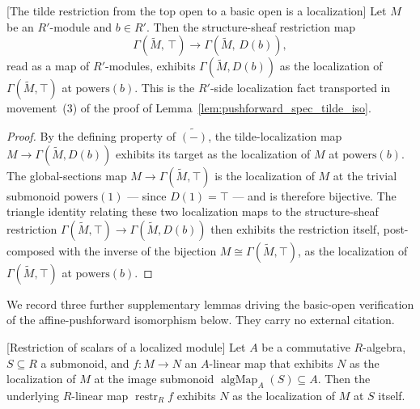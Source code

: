 \begin{lemma}


[The tilde restriction from the top open to a basic open is a localization]
  \label{lem:tildeRestriction_isLocalizedModule}
  Let \(M\) be an \(R'\)-module and \(b \in R'\). Then the structure-sheaf
  restriction map
  \[
    \Gamma(\widetilde M,\, \top) \longrightarrow \Gamma(\widetilde M,\, D(b)),
  \]
  read as a map of \(R'\)-modules, exhibits \(\Gamma(\widetilde M, D(b))\) as the
  localization of \(\Gamma(\widetilde M, \top)\) at \(\mathrm{powers}(b)\). This is
  the \(R'\)-side localization fact transported in movement~(3) of the proof of
  Lemma~\ref{lem:pushforward_spec_tilde_iso}.
\end{lemma}

\begin{proof}


  By the defining property of \(\widetilde{(-)}\), the tilde-localization map
  \(M \to \Gamma(\widetilde M, D(b))\) exhibits its target as the localization of
  \(M\) at \(\mathrm{powers}(b)\). The global-sections map
  \(M \to \Gamma(\widetilde M, \top)\) is the localization of \(M\) at the trivial
  submonoid \(\mathrm{powers}(1)\) — since \(D(1) = \top\) — and is therefore
  bijective. The triangle identity relating these two localization maps to the
  structure-sheaf restriction \(\Gamma(\widetilde M, \top) \to
  \Gamma(\widetilde M, D(b))\) then exhibits the restriction itself, post-composed
  with the inverse of the bijection \(M \cong \Gamma(\widetilde M, \top)\), as the
  localization of \(\Gamma(\widetilde M, \top)\) at \(\mathrm{powers}(b)\).
\end{proof}

We record three further supplementary lemmas driving the basic-open verification
of the affine-pushforward isomorphism below. They carry no external citation.

\begin{lemma}


[Restriction of scalars of a localized module]
  \label{lem:powers_restrictScalars}
  Let \(A\) be a commutative \(R\)-algebra, \(S \subseteq R\) a submonoid, and
  \(f : M \to N\) an \(A\)-linear map that exhibits \(N\) as the localization of
  \(M\) at the image submonoid
  \(\operatorname{algMap}_A(S) \subseteq A\). Then the underlying \(R\)-linear map
  \(\operatorname{restr}_R f\) exhibits \(N\) as the localization of \(M\) at \(S\)
  itself.
\end{lemma}

